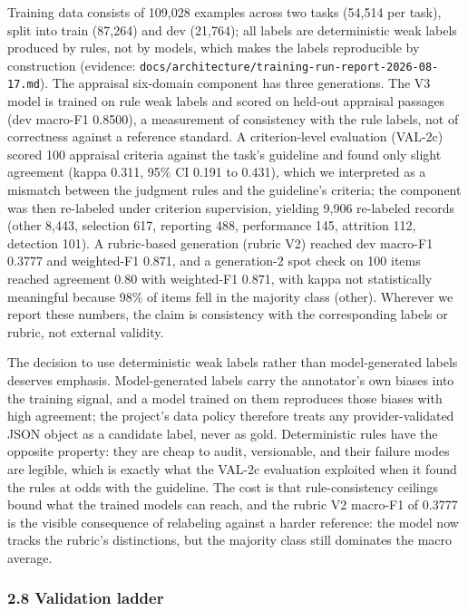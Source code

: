 \documentclass[
]{article}
\begin{document}
Training data consists of 109,028 examples across two tasks (54,514 per
task), split into train (87,264) and dev (21,764); all labels are
deterministic weak labels produced by rules, not by models, which makes
the labels reproducible by construction (evidence:
\texttt{docs/architecture/training-run-report-2026-08-17.md}). The
appraisal six-domain component has three generations. The V3 model is
trained on rule weak labels and scored on held-out appraisal passages
(dev macro-F1 0.8500), a measurement of consistency with the rule
labels, not of correctness against a reference standard. A
criterion-level evaluation (VAL-2c) scored 100 appraisal criteria
against the task's guideline and found only slight agreement (kappa
0.311, 95\% CI 0.191 to 0.431), which we interpreted as a mismatch
between the judgment rules and the guideline's criteria; the component
was then re-labeled under criterion supervision, yielding 9,906
re-labeled records (other 8,443, selection 617, reporting 488,
performance 145, attrition 112, detection 101). A rubric-based
generation (rubric V2) reached dev macro-F1 0.3777 and weighted-F1
0.871, and a generation-2 spot check on 100 items reached agreement 0.80
with weighted-F1 0.871, with kappa not statistically meaningful because
98\% of items fell in the majority class (other). Wherever we report
these numbers, the claim is consistency with the corresponding labels or
rubric, not external validity.

The decision to use deterministic weak labels rather than
model-generated labels deserves emphasis. Model-generated labels carry
the annotator's own biases into the training signal, and a model trained
on them reproduces those biases with high agreement; the project's data
policy therefore treats any provider-validated JSON object as a
candidate label, never as gold. Deterministic rules have the opposite
property: they are cheap to audit, versionable, and their failure modes
are legible, which is exactly what the VAL-2c evaluation exploited when
it found the rules at odds with the guideline. The cost is that
rule-consistency ceilings bound what the trained models can reach, and
the rubric V2 macro-F1 of 0.3777 is the visible consequence of
relabeling against a harder reference: the model now tracks the rubric's
distinctions, but the majority class still dominates the macro average.

\subsubsection{2.8 Validation ladder}\label{validation-ladder}
\end{document}

